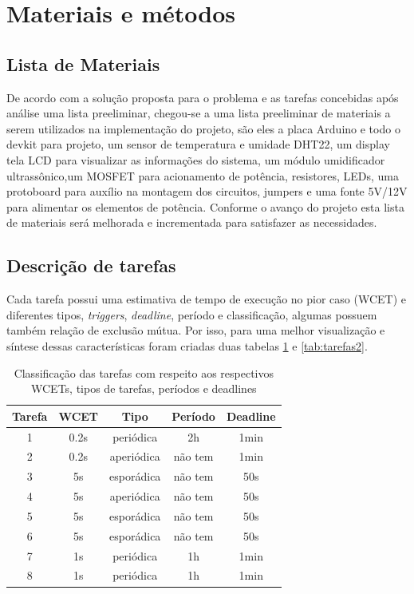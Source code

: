 \documentclass[conference]{IEEEtran}
\begin{document}
\section{Materiais e métodos}
\subsection{Lista de Materiais} 
De acordo com a solução proposta para o problema e as tarefas concebidas após análise uma lista preeliminar, chegou-se a uma lista preeliminar de materiais a serem utilizados na implementação do projeto, são eles a placa Arduino e todo o devkit para projeto, um sensor de temperatura e umidade DHT22, um display tela LCD para visualizar as informações do sistema, um módulo umidificador ultrassônico,um MOSFET para acionamento de potência, resistores, LEDs, uma protoboard para auxílio na montagem dos circuitos, jumpers e uma fonte 5V/12V para alimentar os elementos de potência.
Conforme o avanço do projeto esta lista de materiais será melhorada e incrementada para satisfazer as necessidades.

\subsection{Descrição de tarefas}

Cada tarefa possui uma estimativa de tempo de execução no pior caso (WCET) e diferentes tipos, \textit{triggers}, \textit{deadline}, período e classificação, algumas possuem também relação de exclusão mútua. Por isso, para uma melhor visualização e síntese dessas características foram criadas duas tabelas \ref{tab:tarefas} e \ref{tab:tarefas2}.

\begin{table}[H]
	\centering
	\begin{tabular}{|c|c|c|c|c|}
		\hline
		Tarefa & WCET & Tipo & Período & Deadline\\
		\hline
		1 & 0.2s& periódica& 2h& 1min \\
		\hline
		2 & 0.2s& aperiódica& não tem& 1min\\
		\hline
		3 & 5s& esporádica& não tem& 50s\\
		\hline
		4 & 5s& aperiódica& não tem& 50s\\
		\hline
		5 & 5s& esporádica& não tem& 50s\\
		\hline
		6 & 5s& esporádica& não tem& 50s\\
		\hline
		7 & 1s& periódica& 1h& 1min\\
		\hline
		8 & 1s& periódica& 1h& 1min\\
		\hline
	\end{tabular}
	\caption{Classificação das tarefas com respeito aos respectivos WCETs, tipos de tarefas, períodos e deadlines}
	\label{tab:tarefas}
\end{table}
\end{document}
